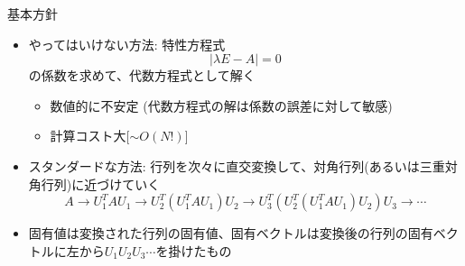 \begin{frame}[t,fragile]{基本方針}
  \begin{itemize}
  \item やってはいけない方法: 特性方程式
    \[
    |\lambda E - A| = 0
    \]
    の係数を求めて、代数方程式として解く
    \begin{itemize}
    \item 数値的に不安定 (代数方程式の解は係数の誤差に対して敏感)
    \item 計算コスト大[$\sim O(N!)$]
    \end{itemize}
  \item スタンダードな方法: 行列を次々に直交変換して、対角行列(あるいは三重対角行列)に近づけていく
    \[
    A \rightarrow U_1^T A U_1 \rightarrow U_2^T (U_1^T A U_1) U_2 \rightarrow U_3^T (U_2^T (U_1^T A U_1) U_2) U_3 \rightarrow \cdots
    \]
  \item 固有値は変換された行列の固有値、固有ベクトルは変換後の行列の固有ベクトルに左から$U_1 U_2 U_3 \cdots$を掛けたもの
  \end{itemize}
\end{frame}
